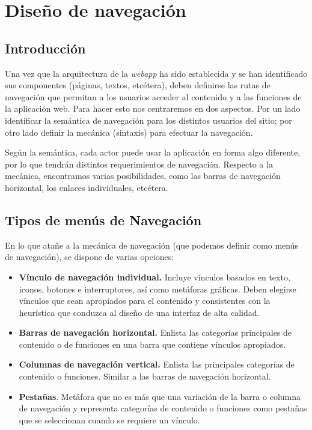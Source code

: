 

	\section{Diseño de navegación} %
	\label{sec:navegacion}
	
	\subsection{Introducción} %
		\label{sub:nav_introduccion}
	
		Una vez que la arquitectura de la \textit{webapp} ha sido establecida y se han identificado sus componentes (páginas, textos, etcétera), deben definirse las rutas de navegación que permitan a los usuarios acceder al contenido y a las funciones de la aplicación web. Para hacer esto nos centraremos en dos aspectos. Por un lado identificar la semántica de navegación para los distintos usuarios del sitio; por otro lado definir la mecánica (sintaxis) para efectuar la navegación.
		
		Según la semántica, cada actor puede usar la aplicación en forma algo diferente, por lo que tendrán distintos requerimientos de navegación. Respecto a la mecánica, encontramos varias posibilidades, como las barras de navegación horizontal, los enlaces individuales, etcétera.
		
	
	\subsection{Tipos de menús de Navegación} %
	\label{sub:nav_contenidos_y_navegacion}
		
	En lo que atañe a la mecánica de navegación (que podemos definir como menús de navegación), se dispone de varias opciones:
	\begin{itemize}
		\item \textbf{Vínculo de navegación individual.} Incluye vínculos basados en texto, iconos, botones e interruptores, así como metáforas gráficas. Deben elegirse vínculos que sean apropiados para el contenido y consistentes con la heurística que conduzca al diseño de una interfaz de alta calidad.
		\item \textbf{Barras de navegación horizontal.} Enlista las categorías principales de contenido o de funciones en una barra que contiene vínculos apropiados.
		\item \textbf{Columnas de navegación vertical.} Enlista las principales categorías de contenido o funciones. Similar a las barras de navegación horizontal.
		\item \textbf{Pestañas}. Metáfora que no es más que una variación de la barra o columna de navegación y representa categorías de contenido o funciones como pestañas que se seleccionan cuando se requiere un vínculo.
	\end{itemize} 

